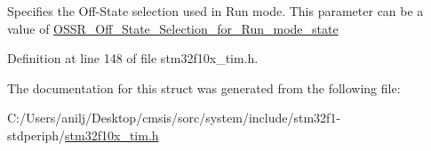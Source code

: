 Specifies the Off-\/\+State selection used in Run mode. This parameter can be a value of \hyperlink{group___o_s_s_r___off___state___selection__for___run__mode__state}{O\+S\+S\+R\+\_\+\+Off\+\_\+\+State\+\_\+\+Selection\+\_\+for\+\_\+\+Run\+\_\+mode\+\_\+state} 

Definition at line 148 of file stm32f10x\+\_\+tim.\+h.



The documentation for this struct was generated from the following file\+:\begin{DoxyCompactItemize}
\item 
C\+:/\+Users/anilj/\+Desktop/cmsis/sorc/system/include/stm32f1-\/stdperiph/\hyperlink{stm32f10x__tim_8h}{stm32f10x\+\_\+tim.\+h}\end{DoxyCompactItemize}
